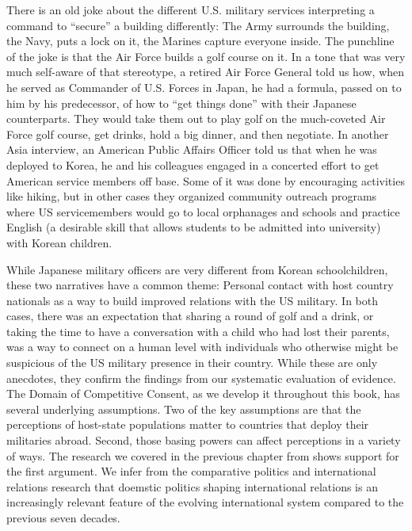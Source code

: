There is an old joke about the different U.S. military services interpreting a command to ``secure'' a building differently: The Army surrounds the building, the Navy, puts a lock on it, the Marines capture everyone inside. The punchline of the joke is that the Air Force builds a golf course on it. In a tone that was very much self-aware of that stereotype, a retired Air Force General told us how, when he served as Commander of U.S. Forces in Japan, he had a formula, passed on to him by his predecessor, of how to ``get things done'' with their Japanese counterparts. They would take them out to play golf on the much-coveted Air Force golf course, get drinks, hold a big dinner, and then negotiate.\cite{japantwo20211022} In another Asia interview, an American Public Affairs Officer told us that when he was deployed to Korea, he and his colleagues engaged in a concerted effort to get American service members off base. Some of it was done by encouraging activities like hiking, but in other cases they organized community outreach programs where US servicemembers would go to local orphanages and schools and practice English (a desirable skill that allows students to be admitted into university) with Korean children.\cite{koreatwo20211013}


While Japanese military officers are very different from Korean schoolchildren, these two narratives have a common theme: Personal contact with host country nationals as a way to build improved relations with the US military. In both cases, there was an expectation that sharing a round of golf and a drink, or taking the time to have a conversation with a child who had lost their parents, was a way to connect on a human level with individuals who otherwise might be suspicious of the US military presence in their country. While these are only anecdotes, they confirm the findings from our systematic evaluation of evidence. The Domain of Competitive Consent, as we develop it throughout this book, has several underlying assumptions. Two of the key assumptions are that the perceptions of host-state populations matter to countries that deploy their militaries abroad. Second, those basing powers can affect perceptions in a variety of ways. The research we covered in the previous chapter from shows support for the first argument. We infer from the comparative politics and international relations research that doemstic politics shaping international relations is an increasingly relevant feature of the evolving international system compared to the previous seven decades.

